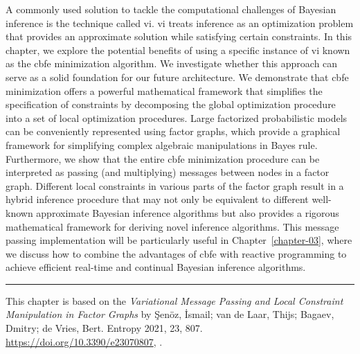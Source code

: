 A commonly used solution to tackle the computational challenges of Bayesian inference is the
technique called \acf{vi}.
\Ac{vi} treats inference as an optimization problem that provides an approximate solution while
satisfying certain constraints.
In this chapter, we explore the potential benefits of using a specific instance of \ac{vi} known as
the \acf{cbfe} minimization algorithm. 
We investigate whether this approach can serve as a solid foundation for our future
architecture.
We demonstrate that \ac{cbfe} minimization offers a powerful mathematical framework that
simplifies the specification of constraints by decomposing the global optimization procedure
into a set of local optimization procedures.
Large factorized probabilistic models can be conveniently represented using factor graphs,
which provide a graphical framework for simplifying complex algebraic manipulations in Bayes
rule.
Furthermore, we show that the entire \ac{cbfe} minimization procedure can be interpreted as passing
(and multiplying) messages between nodes in a factor graph.
Different local constraints in various parts of the factor graph result in a hybrid inference
procedure that may not only be equivalent to different well-known approximate Bayesian
inference algorithms but also provides a rigorous mathematical framework for deriving novel
inference algorithms.
This message passing implementation will be particularly useful in Chapter~\ref{chapter-03},
where we discuss how to combine the advantages of \ac{cbfe} with reactive programming to achieve
efficient real-time and continual Bayesian inference algorithms.

\par\noindent\rule{\textwidth}{0.5pt}

This chapter is based on the \textit{Variational Message Passing and Local Constraint Manipulation in Factor Graphs} by Şenöz, İsmail; van de Laar, Thijs; Bagaev, Dmitry; de Vries, Bert. Entropy 2021, 23, 807. \url{https://doi.org/10.3390/e23070807}, \citep{senoz_variational_2021}.

